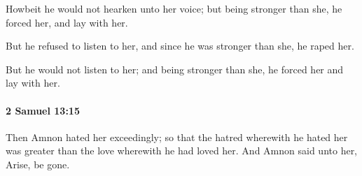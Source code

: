 			\begin{versebox}
					\item[BHS] 
					\item[ASV] Howbeit he would not hearken unto her voice; but being stronger than she, he forced her, and lay with her.
					\item[NIV] But he refused to listen to her, and since he was stronger than she, he raped her.
					\item[NRSV] But he would not listen to her; and being stronger than she, he forced her and lay with her.
			\end{versebox}

		\paragraph{2 Samuel 13:15} %
			\label{2SAMUEL-13-15}

			Then Amnon hated her exceedingly; so that the hatred wherewith he hated her was greater than the love wherewith he had loved her. And Amnon said unto her, Arise, be gone.

